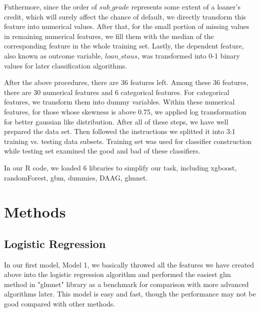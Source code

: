 \documentclass[12pt]{article}
\begin{document}
Futhermore, since the order of $sub\_grade$ represents some extent of a loaner's credit, which will surely affect the chance of default, we directly transform this feature into numerical values. After that, for the small portion of missing values in remaining numerical features, we fill them with the median of the corresponding feature in the whole training set. Lastly, the dependent feature, also known as outcome variable, $loan\_staus$, was transformed into 0-1 binary values for later classification algorithms.

    After the above procedures, there are 36 features left. Among these 36 features, there are 30 numerical features and 6 categorical features. For categorical features, we transform them into dummy variables. Within these numerical features, for those whose skewness is above 0.75, we applied log transformation for better gaussian like distribution. After all of these steps, we have well prepared the data set. Then followed the instructions we splitted it into 3:1 training vs. testing data subsets. Training set was used for classifier construction while testing set examined the good and bad of these classifiers.

In our R code, we loaded 6 libraries to simplify our task, including xgboost, randomForest, gbm, dummies, DAAG, glmnet.


\section{Methods}

\subsection{Logistic Regression}
\quad In our first model, Model 1, we basically throwed all the features we have created above into the logistic regression algorithm and performed the easiest glm method in "glmnet" library as a benchmark for comparison with more advanced algorithms later. This model is easy and fast, though the performance may not be good compared with other methods.
\end{document}
